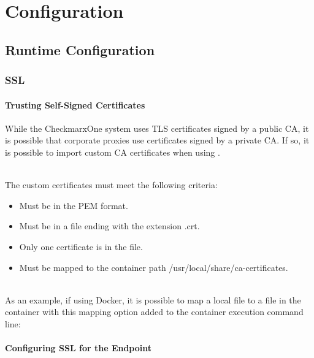 \chapter{Configuration}


\section{Runtime Configuration}\label{sec:runtime-config}

\subsection{SSL}

\subsubsection{Trusting Self-Signed Certificates}\label{sec:self-signed-certs}

While the CheckmarxOne system uses TLS certificates signed by a public CA, it is possible that
corporate proxies use certificates signed by a private CA. If so, it is possible to
import custom CA certificates when using \cxoneflow.

\noindent\\The custom certificates must meet the following criteria:

\begin{itemize}
    \item Must be in the PEM format.
    \item Must be in a file ending with the extension .crt.
    \item Only one certificate is in the file.
    \item Must be mapped to the container path /usr/local/share/ca-certificates.
\end{itemize}


\noindent\\As an example, if using Docker, it is possible to map a local file to a file in the container with this mapping option added to the container execution command line:


\subsubsection{Configuring SSL for the \cxoneflow Endpoint}

